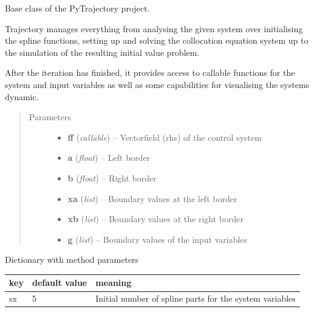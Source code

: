 \documentclass[letterpaper,10pt,english]{sphinxmanual}
\begin{document}
\begin{fulllineitems}
\label{pytrajectory:pytrajectory.trajectory.Trajectory}
Base class of the PyTrajectory project.

Trajectory manages everything from analysing the given system over
initialising the spline functions, setting up and solving the collocation
equation system up to the simulation of the resulting initial value problem.

After the iteration has finished, it provides access to callable functions
for the system and input variables as well as some capabilities for
visualising the systems dynamic.
\begin{quote}\begin{description}
\item[{Parameters}] \leavevmode\begin{itemize}
\item {} 
\textbf{ff} (\emph{callable}) -- Vectorfield (rhs) of the control system

\item {} 
\textbf{a} (\emph{float}) -- Left border

\item {} 
\textbf{b} (\emph{float}) -- Right border

\item {} 
\textbf{xa} (\emph{list}) -- Boundary values at the left border

\item {} 
\textbf{xb} (\emph{list}) -- Boundary values at the right border

\item {} 
\textbf{g} (\emph{list}) -- Boundary values of the input variables

\end{itemize}

\end{description}\end{quote}

\begin{fulllineitems}
\label{pytrajectory:pytrajectory.trajectory.Trajectory.mparam}
Dictionary with method parameters

\begin{tabulary}{\linewidth}{|L|L|L|}
\hline
\textsf{\relax 
key
} & \textsf{\relax 
default value
} & \textsf{\relax 
meaning
}\\
\hline
sx
 & 
5
 & 
Initial number of spline parts for the system variables
\\


\end{tabulary}
\end{fulllineitems}
\end{fulllineitems}
\end{document}
